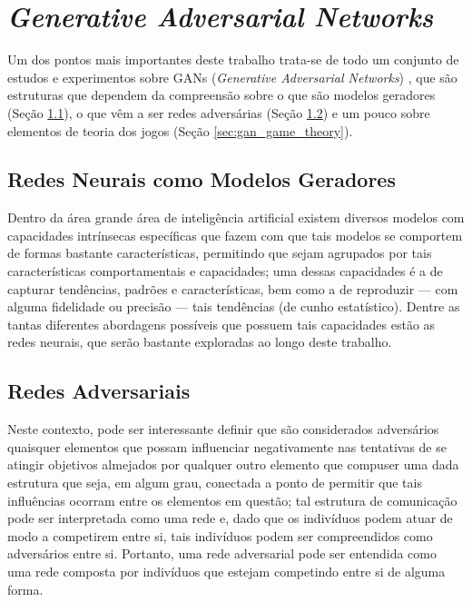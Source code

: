 \chapter{\textit{Generative Adversarial Networks}}
\label{cha:gan}

Um dos pontos mais importantes deste trabalho trata-se de todo um conjunto de estudos e experimentos sobre GANs (\textit{Generative Adversarial Networks}) \citep{NIPS2014_5423}, que são estruturas que dependem da compreensão sobre o que são modelos geradores (Seção \ref{sec:gan_nn_as_generative_model}), o que vêm a ser redes adversárias (Seção \ref{sec:gan_adversarial_nets}) e um pouco sobre elementos de teoria dos jogos (Seção \ref{sec:gan_game_theory}).

\section{Redes Neurais como Modelos Geradores}
\label{sec:gan_nn_as_generative_model}

Dentro da área grande área de inteligência artificial existem diversos modelos com capacidades intrínsecas específicas que fazem com que tais modelos se comportem de formas bastante características, permitindo que sejam agrupados por tais características comportamentais e capacidades; uma dessas capacidades é a de capturar tendências, padrões e características, bem como a de reproduzir --- com alguma fidelidade ou precisão --- tais tendências (de cunho estatístico). Dentre as tantas diferentes abordagens possíveis que possuem tais capacidades estão as redes neurais, que serão bastante exploradas ao longo deste trabalho.



\section{Redes Adversariais}
\label{sec:gan_adversarial_nets}

Neste contexto, pode ser interessante definir que são considerados adversários quaisquer elementos que possam influenciar negativamente nas tentativas de se atingir objetivos almejados por qualquer outro elemento que compuser uma dada estrutura que seja, em algum grau, conectada a ponto de permitir que tais influências ocorram entre os elementos em questão; tal estrutura de comunicação pode ser interpretada como uma rede e, dado que os indivíduos podem atuar de modo a competirem entre si, tais indivíduos podem ser compreendidos como adversários entre si. Portanto, uma rede adversarial pode ser entendida como uma rede composta por indivíduos que estejam competindo entre si de alguma forma.



